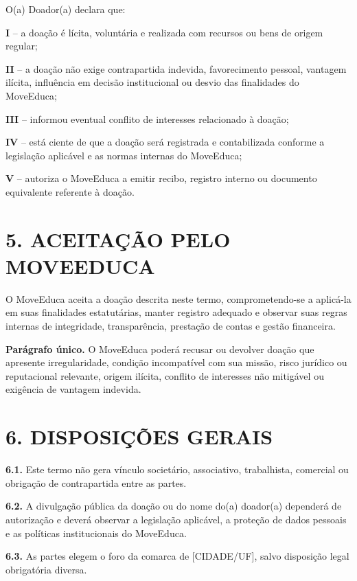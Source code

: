 \documentclass[11pt,a4paper]{article}
\begin{document}
O(a) Doador(a) declara que:

\textbf{I} -- a doação é lícita, voluntária e realizada com recursos ou bens de origem regular;

\textbf{II} -- a doação não exige contrapartida indevida, favorecimento pessoal, vantagem ilícita, influência em decisão institucional ou desvio das finalidades do MoveEduca;

\textbf{III} -- informou eventual conflito de interesses relacionado à doação;

\textbf{IV} -- está ciente de que a doação será registrada e contabilizada conforme a legislação aplicável e as normas internas do MoveEduca;

\textbf{V} -- autoriza o MoveEduca a emitir recibo, registro interno ou documento equivalente referente à doação.

\section*{5. ACEITAÇÃO PELO MOVEEDUCA}

O MoveEduca aceita a doação descrita neste termo, comprometendo-se a aplicá-la em suas finalidades estatutárias, manter registro adequado e observar suas regras internas de integridade, transparência, prestação de contas e gestão financeira.

\textbf{Parágrafo único.} O MoveEduca poderá recusar ou devolver doação que apresente irregularidade, condição incompatível com sua missão, risco jurídico ou reputacional relevante, origem ilícita, conflito de interesses não mitigável ou exigência de vantagem indevida.

\section*{6. DISPOSIÇÕES GERAIS}

\textbf{6.1.} Este termo não gera vínculo societário, associativo, trabalhista, comercial ou obrigação de contrapartida entre as partes.

\textbf{6.2.} A divulgação pública da doação ou do nome do(a) doador(a) dependerá de autorização e deverá observar a legislação aplicável, a proteção de dados pessoais e as políticas institucionais do MoveEduca.

\textbf{6.3.} As partes elegem o foro da comarca de [CIDADE/UF], salvo disposição legal obrigatória diversa.
\end{document}
